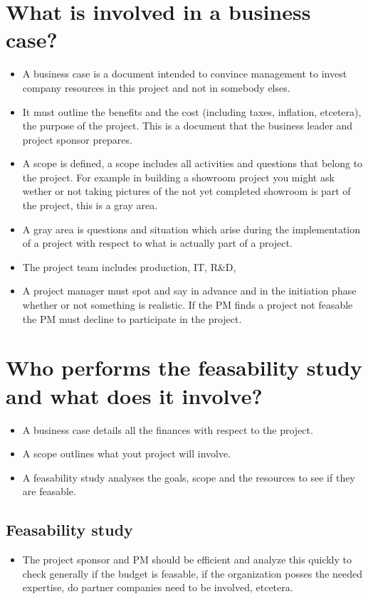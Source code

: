 \section{What is involved in a business case?}  
\begin{itemize}
    \item A business case is a document intended to convince management to invest company resources in this project and not in somebody elses.
    \item It must outline the benefits and the cost (including taxes, inflation, etcetera), the purpose of the project. This is a document that the business leader and project sponsor prepares.
    \item A scope is defined, a scope includes all activities and questions that belong to the project. For example in building a showroom project you might ask wether or not taking pictures of the not yet completed showroom is part of the project, this is a gray area. 
    \item A gray area is questions and situation which arise during the implementation of a project with respect to what is actually part of a project. 
    \item The project team includes production, IT, R\&D, 
    \item A project manager must spot and say in advance and in the initiation phase whether or not something is realistic. If the PM finds a project not feasable the PM must decline to participate in the project.
\end{itemize}

\section{Who performs the feasability study and what does it involve?}
\begin{itemize}
    \item A business case details all the finances with respect to the project.
    \item A scope outlines what yout project will involve.
    \item A feasability study analyses the goals, scope and the resources to see if they are feasable.
\end{itemize}

\subsection{Feasability study}
\begin{itemize}
    \item The project sponsor and PM should be efficient and analyze this quickly to check generally if the budget is feasable, if the organization posses the needed expertise, do partner companies need to be involved, etcetera.
\end{itemize}

